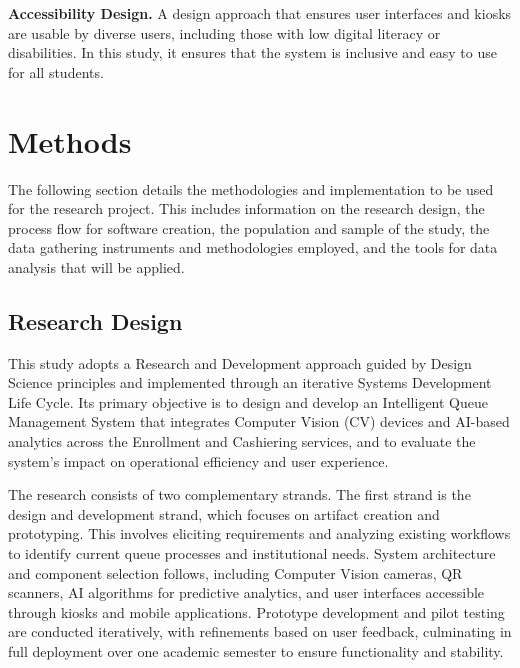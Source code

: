 \documentclass{research}
\begin{document}
\medskip
\indent\textbf{Accessibility Design.} A design approach that ensures user interfaces and kiosks are usable by diverse users, including those with low digital literacy or disabilities. In this study, it ensures that the system is inclusive and easy to use for all students.

\clearpage

\chapter{Methods}

The following section details the methodologies and implementation to be used for the research project. This includes information on the research design, the process flow for software creation, the population and sample of the study, the data gathering instruments and methodologies employed, and the tools for data analysis that will be applied.

\section{Research Design}

This study adopts a Research and Development approach guided by Design Science principles and implemented through an iterative Systems Development Life Cycle. Its primary objective is to design and develop an Intelligent Queue Management System that integrates Computer Vision (CV) devices and AI-based analytics across the Enrollment and Cashiering services, and to evaluate the system's impact on operational efficiency and user experience. 

The research consists of two complementary strands. The first strand is the design and development strand, which focuses on artifact creation and prototyping. This involves eliciting requirements and analyzing existing workflows to identify current queue processes and institutional needs. System architecture and component selection follows, including Computer Vision cameras, QR scanners, AI algorithms for predictive analytics, and user interfaces accessible through kiosks and mobile applications. Prototype development and pilot testing are conducted iteratively, with refinements based on user feedback, culminating in full deployment over one academic semester to ensure functionality and stability. 
\end{document}
